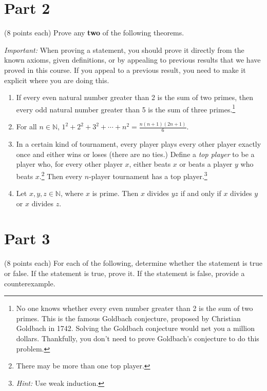 \documentclass[11pt]{article}
\theoremstyle{definition}
\begin{document}
\section*{Part 2}

(8 points each) Prove any \textbf{two} of the following theorems.

\bigskip

\emph{Important:} When proving a statement, you should prove it directly from the known axioms, given definitions, or by appealing to previous results that we have proved in this course.  If you appeal to a previous result, you need to make it explicit where you are doing this.

\begin{enumerate}

\item If every even natural number greater than 2 is the sum of two primes, then every odd natural number greater than 5 is the sum of three primes.\footnote{No one knows whether every even number greater than 2 is the sum of two primes.  This is the famous Goldbach conjecture, proposed by Christian Goldbach in 1742.  Solving the Goldbach conjecture would net you a million dollars.  Thankfully, you don't need to prove Goldbach's conjecture to do this problem.}

\item For all $n\in \mathbb{N}$, $\displaystyle 1^2+2^2+3^2+\cdots+n^2=\frac{n(n+1)(2n+1)}{6}$.

\item In a certain kind of tournament, every player plays every other player exactly once and either wins or loses (there are no ties.)  Define a \emph{top player} to be a player who, for every other player $x$, either beats $x$ or beats a player $y$ who beats $x$.\footnote{There may be more than one top player.}  Then every $n$-player tournament has a top player.\footnote{\emph{Hint:} Use weak induction.}

\item Let $x,y,z\in \mathbb{N}$, where $x$ is prime.  Then $x$ divides $yz$ if and only if $x$ divides $y$ or $x$ divides $z$.

\end{enumerate}

\section*{Part 3}

(8 points each) For each of the following, determine whether the statement is true or false.  If the statement is true, prove it.  If the statement is false, provide a counterexample.
\end{document}
